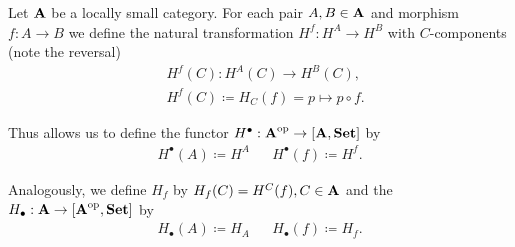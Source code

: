 \begin{definition}\label{def:yoneda_embedding}\cite[definitions 4.1.15, 4.1.21]{Leinster2014}
  Let $\operatorname{\mathbf{A}}$ be a locally small category. For each pair $A, B \in \operatorname{\mathbf{A}}$ and morphism $f: A \to B$ we define the natural transformation $H^f: H^A \to H^B$ with $C$-components (note the reversal)
  \begin{align*}
    &H^f(C): H^A(C) \to H^B(C), \\
    &H^f(C) \coloneqq H_C(f) = p \mapsto p \circ f.
  \end{align*}

  Thus allows us to define the functor $H^\bullet: \operatorname{\mathbf{A}}^{\operatorname{op}} \to [\operatorname{\mathbf{A}}, \operatorname{\mathbf{Set}}]$ by
  \begin{align*}
    H^\bullet(A) \coloneqq H^A && H^\bullet(f) \coloneqq H^f.
  \end{align*}

  Analogously, we define $H_f$ by $H_f(C) = H^C(f), C \in \operatorname{\mathbf{A}}$ and the  $H_\bullet: \operatorname{\mathbf{A}} \to [\operatorname{\mathbf{A}}^{\operatorname{op}}, \operatorname{\mathbf{Set}}]$ by
  \begin{align*}
    H_\bullet(A) \coloneqq H_A && H_\bullet(f) \coloneqq H_f.
  \end{align*}
\end{definition}

